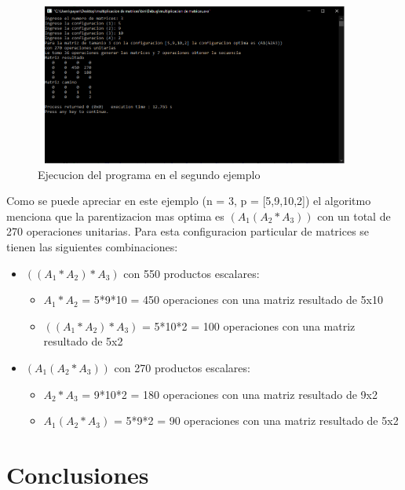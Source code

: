 \documentclass[spanish]{article}
\begin{document}
	\begin{figure}[H]
		\centering
		\includegraphics[width=400px,height=200px]{captura18}
		\caption{Ejecucion del programa en el segundo ejemplo}
	\end{figure}
	Como se puede apreciar en este ejemplo (n = 3, p = [5,9,10,2]) el algoritmo menciona que la parentizacion mas optima es $(A_1(A_2*A_3))$ con un total de 270 operaciones unitarias. Para esta configuracion particular de matrices se tienen las siguientes combinaciones:
	\begin{itemize}
		\item $((A_1*A_2)*A_3)$ con 550 productos escalares:
		\begin{itemize}
			\item $A_1*A_2$ = 5*9*10 = 450 operaciones con una matriz resultado de 5x10
			\item $((A_1*A_2)*A_3)$ = 5*10*2 = 100 operaciones con una matriz resultado de 5x2
		\end{itemize}	
		\item $(A_1(A_2*A_3))$ con 270 productos escalares:
		\begin{itemize}
			\item $A_2*A_3$ = 9*10*2 = 180 operaciones con una matriz resultado de 9x2
			\item $A_1(A_2*A_3)$ = 5*9*2 = 90 operaciones con una matriz resultado de 5x2
		\end{itemize}		
	\end{itemize}
	\section{Conclusiones}	
\end{document}
